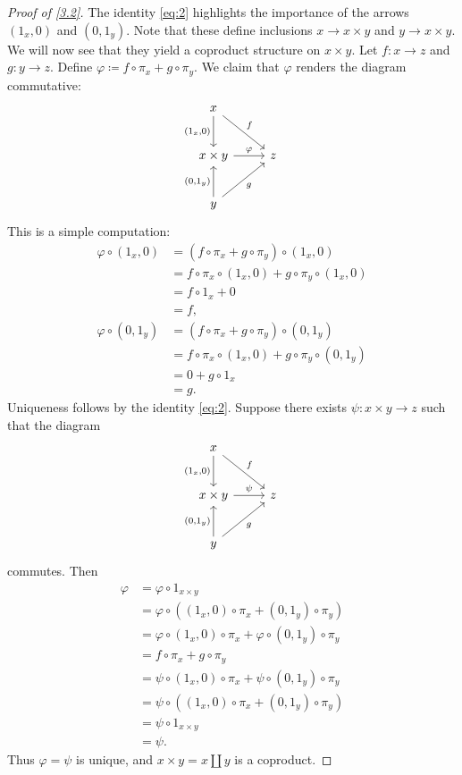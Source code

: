 \begin{proof}[Proof of \cref{3.2}]
	The identity \eqref{eq:2} highlights the importance of the arrows $(1_x,0)$ and $(0,1_y)$. Note that these define inclusions $x\to x\times y$ and $y\to x\times y$. We will now see that they yield a coproduct structure on $x\times y$. Let $f : x \to z$ and $g : y \to z$. Define $\varphi \coloneqq f\circ \pi _x + g\circ \pi _y$. We claim that $\varphi $ renders the diagram commutative:
	\[\begin{tikzcd}[row sep = 2.5em, column sep = 2.5em]
	x \ar[" (1_x\text{,} 0) "', d] \ar[" f ", dr]  &  \\
	x\times y \ar[" \varphi  ", r]  & z \\
	y \ar[" g "', ur] \ar[" (0\text{,} 1_y) ", u]  & 
	\end{tikzcd}\]
	This is a simple computation:
	\begin{align*}
		\varphi \circ (1_x,0) &= (f\circ \pi_x +g\circ \pi _y)\circ (1_x,0)\\
				      &=f\circ \pi _x \circ (1_x,0) + g \circ \pi _y \circ (1_x,0)\\
				      &=f\circ 1_x + 0\\
				      &=f,\\
		\varphi \circ (0,1_y)&=(f\circ \pi _x + g\circ \pi _y)\circ (0,1_y)\\
				      &=f\circ \pi _x \circ (1_x,0) + g \circ \pi _y \circ (0,1_y)\\
				      &=0+g\circ 1_x\\
				      &=g
	.\end{align*}
	Uniqueness follows by the identity \cref{eq:2}. Suppose there exists $\psi : x\times y \to z$ such that the diagram
	\[\begin{tikzcd}[row sep = 2.5em, column sep = 2.5em]
	x \ar[" f ", dr] \ar[" (1_x\text{,} 0) "', d]  &  \\
	x\times y \ar[" \psi  ", r]  & z \\
	y \ar[" g "', ur] \ar[" (0\text{,} 1_y) ", u]  & 
	\end{tikzcd}\]
	commutes. Then
	\begin{align*}
		\varphi &= \varphi \circ 1_{x\times y} \\
			&=\varphi \circ ((1_x,0)\circ \pi _x+(0,1_y)\circ \pi _y)\\
			&=\varphi \circ (1_x,0)\circ \pi _x + \varphi \circ (0,1_y)\circ \pi _y\\
			&=f \circ \pi _x + g\circ \pi _y\\
			&=\psi \circ (1_x,0)\circ \pi _x + \psi \circ (0,1_y)\circ \pi _y\\
			&=\psi \circ ((1_x,0)\circ \pi _x + (0,1_y)\circ \pi _y)\\
			&=\psi \circ 1_{x\times y} \\
			&=\psi 
	.\end{align*}
	Thus $\varphi =\psi $ is unique, and $x\times y=x\amalg y$ is a coproduct.
\end{proof}

